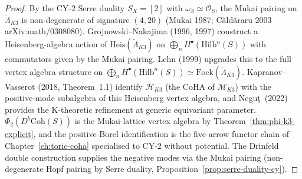 \begin{proof}
By the CY-$2$ Serre duality $S_X = [2]$ with $\omega_S\simeq\mathcal{O}_S$,
the Mukai pairing on $\widetilde{\Lambda}_{K3}$ is non-degenerate of
signature $(4,20)$ (Mukai 1987; C\u{a}ld\u{a}raru 2003
\textup{arXiv:math/0308080}). Grojnowski--Nakajima (1996, 1997) construct
a Heisenberg-algebra action of
$\mathrm{Heis}(\widetilde{\Lambda}_{K3})$ on
$\bigoplus_n H^\bullet(\mathrm{Hilb}^n(S))$ with commutators given by
the Mukai pairing. Lehn (1999) upgrades this to the full vertex algebra
structure on
$\bigoplus_n H^\bullet(\mathrm{Hilb}^n(S)) \simeq \mathrm{Fock}(\widetilde{\Lambda}_{K3})$.
Kapranov--Vasserot (2018, Theorem~1.1) identify
$\mathcal{H}_{K3}$ (the CoHA of $\mathcal{M}_{K3}$) with the positive-mode
subalgebra of this Heisenberg vertex algebra, and Negu\c{t}~(2022)
provides the K-theoretic refinement at generic equivariant parameter.
$\Phi_2(D^b\mathrm{Coh}(S))$ is the Mukai-lattice vertex algebra by
Theorem~\ref{thm:phi-k3-explicit}, and the positive-Borel identification
is the five-arrow functor chain of Chapter~\ref{ch:toric-coha}
specialised to CY-$2$ without potential. The Drinfeld double construction
supplies the negative modes via the Mukai pairing (non-degenerate Hopf
pairing by Serre duality, Proposition~\ref{prop:serre-duality-cy}).
\end{proof}

